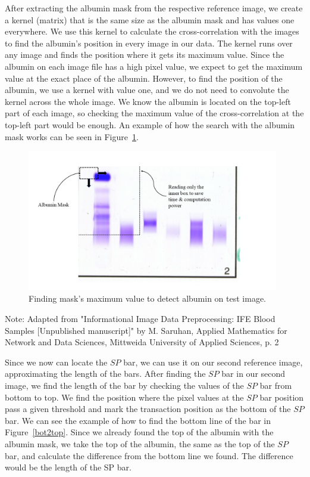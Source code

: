 After extracting the albumin mask from the respective reference image, we create a kernel (matrix) that is the same size as the albumin mask and has values one everywhere. We use this kernel to calculate the cross-correlation with the images to find the albumin’s position in every image in our data. The kernel runs over any image and finds the position where it gets its maximum value. Since the albumin on each image file has a high pixel value, we expect to get the maximum value at the exact place of the albumin. However, to find the position of the albumin, we use a kernel with value one, and we do not need to convolute the kernel across the whole image. We know the albumin is located on the top-left part of each image, so checking the maximum value of the cross-correlation at the top-left part would be enough. An example of how the search with the albumin mask works can be seen in Figure~\ref{findalbumin}.

\begin{figure}[H]
    \centering
    \includegraphics[width=0.98\textwidth]{images/old imgs/mask_in_use.png}
    \caption{Finding mask's maximum value to detect albumin on test image.}
    \label{findalbumin}
\end{figure}

\noindent Note: Adapted from "Informational Image Data Preprocessing: IFE Blood Samples
[Unpublished manuscript]" by M. Saruhan, Applied Mathematics for Network and Data Sciences,
Mittweida University of Applied Sciences, p. 2 ~\cite{mypap}
\vspace{10pt}

Since we now can locate the $SP$ bar, we can use it on our second reference image, approximating the length of the bars. After finding the $SP$ bar in our second image, we find the length of the bar by checking the values of the $SP$ bar from bottom to top. We find the position where the pixel values at the $SP$ bar position pass a given threshold and mark the transaction position as the bottom of the $SP$ bar. We can see the example of how to find the bottom line of the bar in Figure~\ref{bot2top}. Since we already found the top of the albumin with the albumin mask, we take the top of the albumin, the same as the top of the $SP$ bar, and calculate the difference from the bottom line we found. The difference would be the length of the SP bar.

